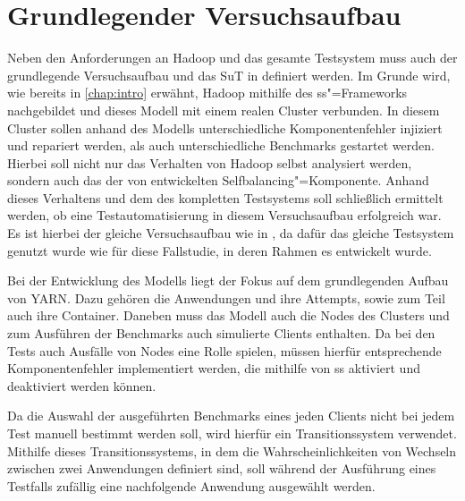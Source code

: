\section{Grundlegender Versuchsaufbau}
\label{sec:clusterSetup}

Neben den Anforderungen an Hadoop und das gesamte Testsystem muss auch der grundlegende Versuchsaufbau und das \ac{SuT} in definiert werden.
Im Grunde wird, wie bereits in \autoref{chap:intro} erwähnt, Hadoop mithilfe des \ac{ss}"=Frameworks nachgebildet und dieses Modell mit einem realen Cluster verbunden.
In diesem Cluster sollen anhand des Modells unterschiedliche Komponentenfehler injiziert und repariert werden, als auch unterschiedliche Benchmarks gestartet werden.
Hierbei soll nicht nur das Verhalten von Hadoop selbst analysiert werden, sondern auch das der von \citeauthor{zhang2016} entwickelten Selfbalancing"=Komponente.
Anhand dieses Verhaltens und dem des kompletten Testsystems soll schließlich ermittelt werden, ob eine Testautomatisierung in diesem Versuchsaufbau erfolgreich war.
Es ist hierbei der gleiche Versuchsaufbau wie in \cite{Eberhardinger2018}, da dafür das gleiche Testsystem genutzt wurde wie für diese Fallstudie, in deren Rahmen es entwickelt wurde.

Bei der Entwicklung des Modells liegt der Fokus auf dem grundlegenden Aufbau von \ac{YARN}.
Dazu gehören die Anwendungen und ihre Attempts, sowie zum Teil auch ihre Container.
Daneben muss das Modell auch die Nodes des Clusters und zum Ausführen der Benchmarks auch simulierte Clients enthalten.
Da bei den Tests auch Ausfälle von Nodes eine Rolle spielen, müssen hierfür entsprechende Komponentenfehler implementiert werden, die mithilfe von \ac{ss} aktiviert und deaktiviert werden können.

Da die Auswahl der ausgeführten Benchmarks eines jeden Clients nicht bei jedem Test manuell bestimmt werden soll, wird hierfür ein Transitionssystem verwendet.
Mithilfe dieses Transitionssystems, in dem die Wahrscheinlichkeiten von Wechseln zwischen zwei Anwendungen definiert sind, soll während der Ausführung eines Testfalls zufällig eine nachfolgende Anwendung ausgewählt werden.

